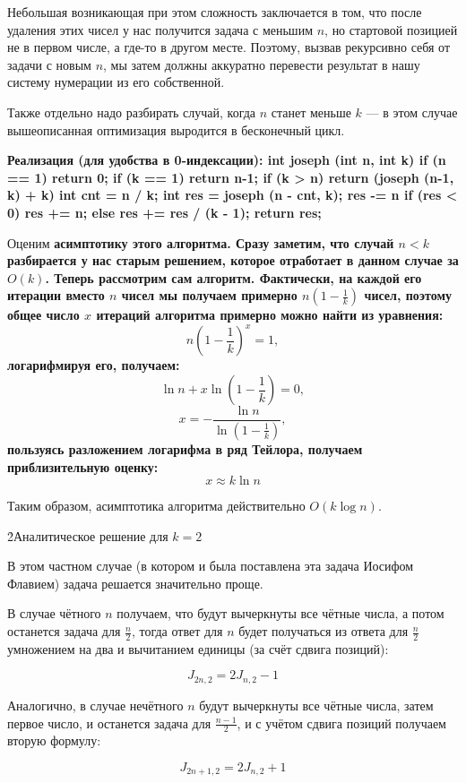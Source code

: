 Небольшая возникающая при этом сложность заключается в том, что после удаления этих чисел у нас получится задача с меньшим $n$, но стартовой позицией не в первом числе, а где-то в другом месте. Поэтому, вызвав рекурсивно себя от задачи с новым $n$, мы затем должны аккуратно перевести результат в нашу систему нумерации из его собственной.

Также отдельно надо разбирать случай, когда $n$ станет меньше $k$ --- в этом случае вышеописанная оптимизация выродится в бесконечный цикл.

\bf{Реализация} (для удобства в 0-индексации):
\code
int joseph (int n, int k) {
	if (n == 1)  return 0;
	if (k == 1)  return n-1;
	if (k > n)  return (joseph (n-1, k) + k) %
	int cnt = n / k;
	int res = joseph (n - cnt, k);
	res -= n %
	if (res < 0)  res += n;
	else  res += res / (k - 1);
	return res;
}
\endcode

Оценим \bf{асимптотику} этого алгоритма. Сразу заметим, что случай $n < k$ разбирается у нас старым решением, которое отработает в данном случае за $O(k)$. Теперь рассмотрим сам алгоритм. Фактически, на каждой его итерации вместо $n$ чисел мы получаем примерно $n \left( 1 - \frac{1}{k} \right)$ чисел, поэтому общее число $x$ итераций алгоритма примерно можно найти из уравнения:
$$ n \left( 1 - \frac{1}{k} \right) ^ x = 1, $$
логарифмируя его, получаем:
$$ \ln n + x \ln \left( 1 - \frac{1}{k} \right) = 0, $$
$$ x = - \frac{ \ln n }{ \ln \left( 1 - \frac{1}{k} \right) }, $$
пользуясь разложением логарифма в ряд Тейлора, получаем приблизительную оценку:
$$ x \approx k \ln n $$

Таким образом, асимптотика алгоритма действительно $O(k \log n)$.

\h2{Аналитическое решение для $k=2$}

В этом частном случае (в котором и была поставлена эта задача Иосифом Флавием) задача решается значительно проще.

В случае чётного $n$ получаем, что будут вычеркнуты все чётные числа, а потом останется задача для $\frac{n}{2}$, тогда ответ для $n$ будет получаться из ответа для $\frac{n}{2}$ умножением на два и вычитанием единицы (за счёт сдвига позиций):

$$ J_{2n,2} = 2 J_{n,2} - 1 $$

Аналогично, в случае нечётного $n$ будут вычеркнуты все чётные числа, затем первое число, и останется задача для $\frac{n-1}{2}$, и с учётом сдвига позиций получаем вторую формулу:

$$ J_{2n+1,2} = 2 J_{n,2} + 1 $$

